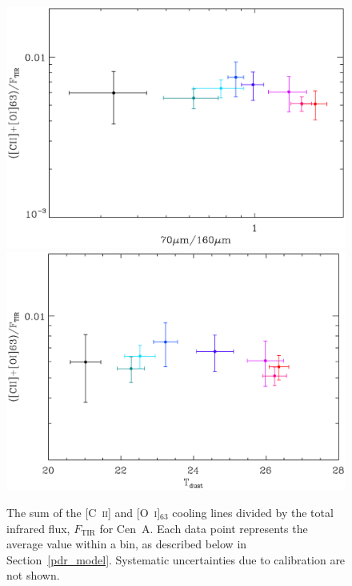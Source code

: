 \documentclass[preprint2]{aastex}
\begin{document}
\begin{figure}
\includegraphics[width=\columnwidth]{CenA_CIIOI63onFtir_vs_70on160_uncorrected_plot_v1}
\includegraphics[width=\columnwidth]{CenA_CIIOI63onFtir_vs_Tdust_uncorrected_plot_v1}
\caption{The sum of the [C~\textsc{ii}] and [O~\textsc{i}]$_{63}$ cooling lines divided by the total infrared flux, $F_{\mathrm{TIR}}$ for Cen~A.  Each data point represents the average value within a bin, as described below in Section~\ref{pdr_model}.  Systematic uncertainties due to calibration are not shown.}
\label{fig:heat_eff}
\end{figure}
\end{document}
